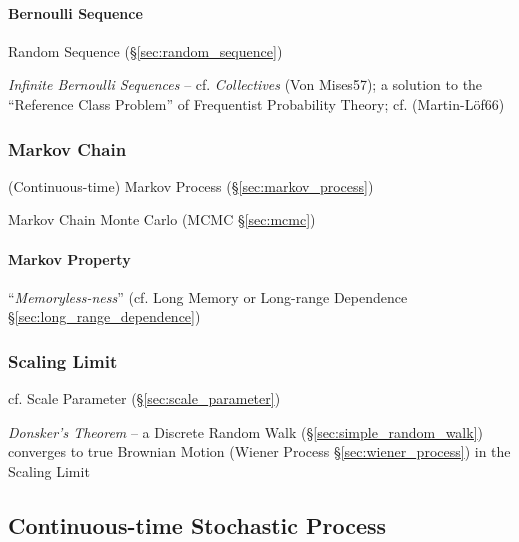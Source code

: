 \paragraph{Bernoulli Sequence}\label{sec:bernoulli_sequence}\hfill

Random Sequence (\S\ref{sec:random_sequence})

\emph{Infinite Bernoulli Sequences} -- cf. \emph{Collectives} (Von Mises57); a
solution to the ``Reference Class Problem'' of Frequentist Probability Theory;
cf. (Martin-L\"of66)



\subsubsection{Markov Chain}\label{sec:markov_chain}

\fist (Continuous-time) Markov Process (\S\ref{sec:markov_process})

Markov Chain Monte Carlo (MCMC \S\ref{sec:mcmc})



\paragraph{Markov Property}\label{sec:markov_property}\hfill

``\emph{Memoryless-ness}'' (cf. Long Memory or Long-range Dependence
\S\ref{sec:long_range_dependence})



\subsubsection{Scaling Limit}\label{sec:scaling_limit}

cf. Scale Parameter (\S\ref{sec:scale_parameter})

\emph{Donsker's Theorem} -- a Discrete Random Walk
(\S\ref{sec:simple_random_walk}) converges to true Brownian Motion (Wiener
Process \S\ref{sec:wiener_process}) in the Scaling Limit



\subsection{Continuous-time Stochastic Process}\label{sec:continuous_stochastic}

